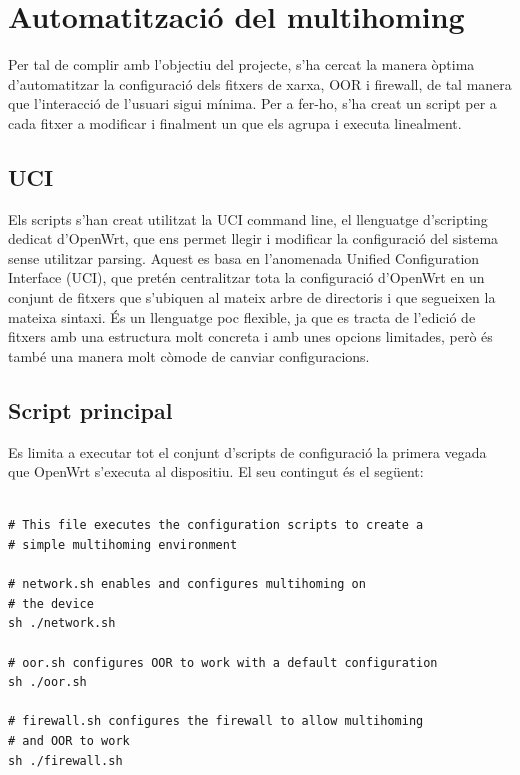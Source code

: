 \documentclass[11pt]{article}
\begin{document}
\section{Automatització del multihoming}
Per tal de complir amb l’objectiu del projecte, s’ha cercat la manera òptima d’automatitzar la configuració dels fitxers de xarxa, OOR i firewall, de tal manera que l’interacció de l’usuari sigui mínima. Per a fer-ho, s’ha creat un script per a cada fitxer a modificar i finalment un que els agrupa i executa linealment. 
\subsection{UCI}
Els scripts s’han creat utilitzat la UCI command line, el llenguatge d’scripting dedicat d’OpenWrt, que ens permet llegir i modificar la configuració del sistema sense utilitzar parsing\cite{uci16}. Aquest es basa en l’anomenada Unified Configuration Interface (UCI), que pretén centralitzar tota la configuració d’OpenWrt en un conjunt de fitxers que s’ubiquen al mateix arbre de directoris i que segueixen la mateixa sintaxi. És un llenguatge poc flexible, ja que es tracta de l’edició de fitxers amb una estructura molt concreta i amb unes opcions limitades, però és també una manera molt còmode de canviar configuracions.
\subsection{Script principal}
Es limita a executar tot el conjunt d’scripts de configuració la primera vegada que OpenWrt s’executa al dispositiu. El seu contingut és el següent:\\
\lstset{language=sh, caption=Script principal d'automatització}
\begin{lstlisting}[frame=single]

# This file executes the configuration scripts to create a
# simple multihoming environment

# network.sh enables and configures multihoming on 
# the device
sh ./network.sh

# oor.sh configures OOR to work with a default configuration
sh ./oor.sh

# firewall.sh configures the firewall to allow multihoming 
# and OOR to work
sh ./firewall.sh
\end{lstlisting}
\end{document}
